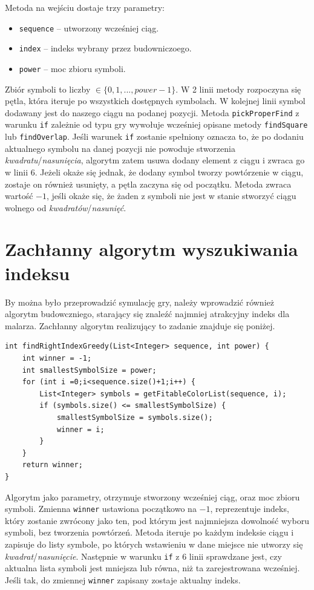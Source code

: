 \documentclass[document]{xmgr}
\begin{document}
Metoda na wejściu dostaje trzy parametry:
\begin{itemize}
\item \texttt{sequence} -- utworzony wcześniej ciąg.
\item \texttt{index} -- indeks wybrany przez budowniczoego.
\item \texttt{power} -- moc zbioru symboli.
\end{itemize}
Zbiór symboli to liczby $\in \{0, 1, ..., power-1\}$. W 2 linii metody rozpoczyna się pętla, która iteruje po wszystkich dostępnych symbolach. W kolejnej linii symbol dodawany jest do naszego ciągu na podanej pozycji. Metoda \texttt{pickProperFind} z warunku \texttt{if} zależnie od typu gry wywołuje wcześniej opisane metody \texttt{findSquare} lub \texttt{findOverlap}. Jeśli warunek \texttt{if} zostanie spełniony oznacza to, że po dodaniu aktualnego symbolu na danej pozycji nie powoduje stworzenia \emph{kwadratu}/\emph{nasunięcia}, algorytm zatem usuwa dodany element z ciągu i zwraca go w linii 6. Jeżeli  okaże się jednak, że dodany symbol tworzy powtórzenie w ciągu, zostaje on również usunięty, a pętla zaczyna się od początku. Metoda zwraca wartość $-1$, jeśli okaże się, że żaden z symboli nie jest w stanie stworzyć ciągu wolnego od \emph{kwadratów}/\emph{nasunięć}.

\section{Zachłanny algorytm wyszukiwania indeksu}
By można było przeprowadzić symulację gry, należy wprowadzić również algorytm budowczniego, starający się znaleźć najmniej atrakcyjny indeks dla malarza. Zachłanny algorytm realizujący to zadanie znajduje się poniżej.

\begin{lstlisting}[frame=single]
int findRightIndexGreedy(List<Integer> sequence, int power) {
	int winner = -1;
	int smallestSymbolSize = power;
	for (int i =0;i<sequence.size()+1;i++) {
		List<Integer> symbols = getFitableColorList(sequence, i);
		if (symbols.size() <= smallestSymbolSize) {
			smallestSymbolSize = symbols.size();
			winner = i;
		}
	}
	return winner;
}
\end{lstlisting}

Algorytm jako parametry, otrzymuje stworzony wcześniej ciąg, oraz moc zbioru symboli. Zmienna \texttt{winner} ustawiona początkowo na $-1$, reprezentuje indeks, który zostanie zwrócony jako ten, pod którym jest najmniejsza dowolność wyboru symboli, bez tworzenia powtórzeń. Metoda iteruje po każdym indeksie ciągu i zapisuje do listy symbole, po których wstawieniu w dane miejsce nie utworzy się \emph{kwadrat}/\emph{nasunięcie}. Następnie w warunku \texttt{if} z 6 linii sprawdzane jest, czy aktualna lista symboli jest mniejsza lub równa, niż ta zarejestrowana wcześniej. Jeśli tak, do zmiennej \texttt{winner} zapisany zostaje aktualny indeks.
\end{document}
